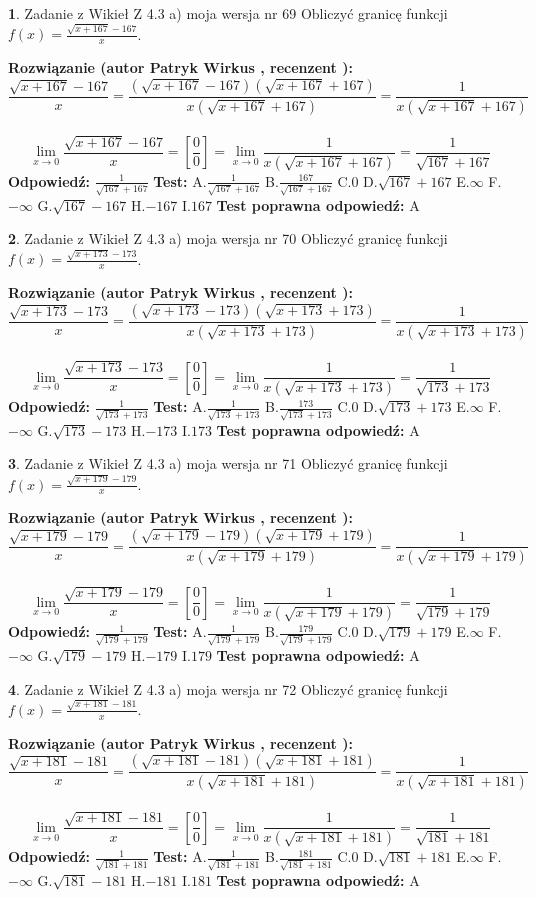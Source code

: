 \documentclass[12pt, a4paper]{article}
\theoremstyle{definition} %
\newtheorem{zad}{}
\newcommand{\zadStart}[1]{\begin{zad}#1\newline}
\newcommand{\zadStop}{\end{zad}}
\newcommand{\rozwStart}[2]{\noindent \textbf{Rozwiązanie (autor #1 , recenzent #2): }\newline}
\newcommand{\rozwStop}{\newline}
\newcommand{\odpStart}{\noindent \textbf{Odpowiedź:}\newline}
\newcommand{\odpStop}{\newline}
\newcommand{\testStart}{\noindent \textbf{Test:}\newline}
\newcommand{\testStop}{\newline}
\newcommand{\kluczStart}{\noindent \textbf{Test poprawna odpowiedź:}\newline}
\newcommand{\kluczStop}{\newline}
\begin{document}
\zadStart{Zadanie z Wikieł Z 4.3 a) moja wersja nr 69}
Obliczyć granicę funkcji $f(x)=\frac{\sqrt{x+167}-167}{x}$.
\zadStop
\rozwStart{Patryk Wirkus}{}
$$\frac{\sqrt{x+167}-167}{x}=\frac{(\sqrt{x+167}-167)(\sqrt{x+167}+167)}{x(\sqrt{x+167}+167)}=\frac{1}{x(\sqrt{x+167}+167)}$$
\\
$$\lim\limits_{x\to0}\frac{\sqrt{x+167}-167}{x}=[\frac{0}{0}]=
\lim\limits_{x\to0}\frac{1}{x(\sqrt{x+167}+167)} = \frac{1}{\sqrt{167}+167}$$
\rozwStop
\odpStart
$\frac{1}{\sqrt{167}+167}$
\odpStop
\testStart
A.$\frac{1}{\sqrt{167}+167}$
B.$\frac{167}{\sqrt{167}+167}$
C.$0$
D.$\sqrt{167}+167$
E.$\infty$
F.$-\infty$
G.$\sqrt{167}-167$
H.$-167$
I.$167$
\testStop
\kluczStart
A
\kluczStop



\zadStart{Zadanie z Wikieł Z 4.3 a) moja wersja nr 70}
Obliczyć granicę funkcji $f(x)=\frac{\sqrt{x+173}-173}{x}$.
\zadStop
\rozwStart{Patryk Wirkus}{}
$$\frac{\sqrt{x+173}-173}{x}=\frac{(\sqrt{x+173}-173)(\sqrt{x+173}+173)}{x(\sqrt{x+173}+173)}=\frac{1}{x(\sqrt{x+173}+173)}$$
\\
$$\lim\limits_{x\to0}\frac{\sqrt{x+173}-173}{x}=[\frac{0}{0}]=
\lim\limits_{x\to0}\frac{1}{x(\sqrt{x+173}+173)} = \frac{1}{\sqrt{173}+173}$$
\rozwStop
\odpStart
$\frac{1}{\sqrt{173}+173}$
\odpStop
\testStart
A.$\frac{1}{\sqrt{173}+173}$
B.$\frac{173}{\sqrt{173}+173}$
C.$0$
D.$\sqrt{173}+173$
E.$\infty$
F.$-\infty$
G.$\sqrt{173}-173$
H.$-173$
I.$173$
\testStop
\kluczStart
A
\kluczStop



\zadStart{Zadanie z Wikieł Z 4.3 a) moja wersja nr 71}
Obliczyć granicę funkcji $f(x)=\frac{\sqrt{x+179}-179}{x}$.
\zadStop
\rozwStart{Patryk Wirkus}{}
$$\frac{\sqrt{x+179}-179}{x}=\frac{(\sqrt{x+179}-179)(\sqrt{x+179}+179)}{x(\sqrt{x+179}+179)}=\frac{1}{x(\sqrt{x+179}+179)}$$
\\
$$\lim\limits_{x\to0}\frac{\sqrt{x+179}-179}{x}=[\frac{0}{0}]=
\lim\limits_{x\to0}\frac{1}{x(\sqrt{x+179}+179)} = \frac{1}{\sqrt{179}+179}$$
\rozwStop
\odpStart
$\frac{1}{\sqrt{179}+179}$
\odpStop
\testStart
A.$\frac{1}{\sqrt{179}+179}$
B.$\frac{179}{\sqrt{179}+179}$
C.$0$
D.$\sqrt{179}+179$
E.$\infty$
F.$-\infty$
G.$\sqrt{179}-179$
H.$-179$
I.$179$
\testStop
\kluczStart
A
\kluczStop



\zadStart{Zadanie z Wikieł Z 4.3 a) moja wersja nr 72}
Obliczyć granicę funkcji $f(x)=\frac{\sqrt{x+181}-181}{x}$.
\zadStop
\rozwStart{Patryk Wirkus}{}
$$\frac{\sqrt{x+181}-181}{x}=\frac{(\sqrt{x+181}-181)(\sqrt{x+181}+181)}{x(\sqrt{x+181}+181)}=\frac{1}{x(\sqrt{x+181}+181)}$$
\\
$$\lim\limits_{x\to0}\frac{\sqrt{x+181}-181}{x}=[\frac{0}{0}]=
\lim\limits_{x\to0}\frac{1}{x(\sqrt{x+181}+181)} = \frac{1}{\sqrt{181}+181}$$
\rozwStop
\odpStart
$\frac{1}{\sqrt{181}+181}$
\odpStop
\testStart
A.$\frac{1}{\sqrt{181}+181}$
B.$\frac{181}{\sqrt{181}+181}$
C.$0$
D.$\sqrt{181}+181$
E.$\infty$
F.$-\infty$
G.$\sqrt{181}-181$
H.$-181$
I.$181$
\testStop
\kluczStart
A
\kluczStop
\end{document}
